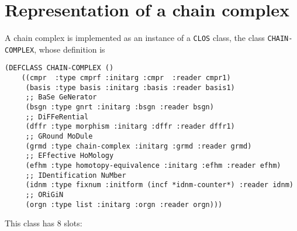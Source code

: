 \section {Representation of a chain complex}

A chain complex is implemented as an instance of a {\tt CLOS} class,
the class {\tt CHAIN-COMPLEX}, whose definition is
{\footnotesize\begin{verbatim}
(DEFCLASS CHAIN-COMPLEX ()
    ((cmpr  :type cmprf :initarg :cmpr  :reader cmpr1)
     (basis :type basis :initarg :basis :reader basis1)
     ;; BaSe GeNerator
     (bsgn :type gnrt :initarg :bsgn :reader bsgn)
     ;; DiFFeRential
     (dffr :type morphism :initarg :dffr :reader dffr1)
     ;; GRound MoDule
     (grmd :type chain-complex :initarg :grmd :reader grmd)
     ;; EFfective HoMology
     (efhm :type homotopy-equivalence :initarg :efhm :reader efhm)
     ;; IDentification NuMber
     (idnm :type fixnum :initform (incf *idnm-counter*) :reader idnm)
     ;; ORiGiN
     (orgn :type list :initarg :orgn :reader orgn)))
\end{verbatim}}
This class has $8$ slots:
